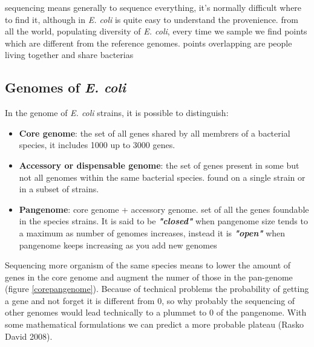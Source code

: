 sequencing means generally to sequence everything, it's normally difficult where to find it, although in \emph{\emph{E. coli}} is quite easy to understand the provenience.
from all the world, populating diversity of \emph{\emph{E. coli}}, every time we sample we find points which are different from the reference genomes.
points overlapping are people living together and share bacterias


\subsection{Genomes of \emph{E. coli}}

In the genome of \emph{E. coli} strains, it is possible to distinguish:

\begin{itemize}
    \item \textbf{Core genome}: the set of all genes shared by all membrers of a bacterial species, it includes 1000 up to 3000 genes.
    \item \textbf{Accessory or dispensable genome}: the set of genes present in some but not all genomes within the same bacterial species. found on a single strain or in a subset of strains.
    \item \textbf{Pangenome}: core genome + accessory genome. set of all the genes foundable in the species strains. It is said to be \textit{\textbf{"closed"}} when pangenome size tends to a maximum as number of genomes increases, instead it is \textit{\textbf{"open"}} when pangenome keeps increasing as you add new genomes
\end{itemize}


Sequencing more organism of the same species means to lower the amount of genes in the core genome and augment the numer of those in the pan-genome (figure \ref{corepangenome}).
Because of technical problems the probability of getting a gene and not forget it is different from 0, so why probably the sequencing of other genomes would lead technically to a plummet to 0 of the pangenome. With some mathematical formulations we can predict a more probable plateau (Rasko David 2008).





